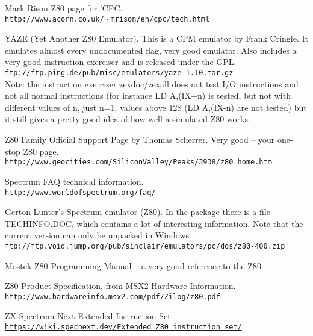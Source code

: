 \documentclass[oneside,a4paper]{book}
\begin{document}
\begin{thebibliography}{}

   Mark Rison Z80 page for !CPC. \\
   {\tt \small http://www.acorn.co.uk/$\sim$mrison/en/cpc/tech.html}

  YAZE (Yet Another Z80 Emulator). This is a CPM emulator 
   by Frank Cringle. It emulates almost every undocumented flag, very good
   emulator. Also includes a very good instruction exerciser and is released
   under the GPL. \\
   {\tt \small ftp://ftp.ping.de/pub/misc/emulators/yaze-1.10.tar.gz} \\
   Note: the instruction exerciser zexdoc/zexall does not test I/O instructions 
   and not all normal instructions (for instance LD A,(IX+n) is tested, but not 
   with different values of n, just n=1, values above 128 (LD A,(IX-n) are not 
   tested) but it still gives a pretty good idea of how well a simulated Z80 
   works.
   
  Z80 Family Official Support Page by Thomas Scherrer. Very 
   good -- your one-stop Z80 page. \\
   {\tt \small http://www.geocities.com/SiliconValley/Peaks/3938/z80\_home.htm}

  Spectrum FAQ technical information. \\
   {\tt \small http://www.worldofspectrum.org/faq/}

  Gerton Lunter's Spectrum emulator (Z80). In the package 
   there is a file TECHINFO.DOC, which contains a lot of interesting 
   information. Note that the current version can only be unpacked in
   Windows. \\
   {\tt \small ftp://ftp.void.jump.org/pub/sinclair/emulators/pc/dos/z80-400.zip}

  Mostek Z80 Programming Manual -- a very good reference
   to the Z80.

  Z80 Product Specification, from MSX2 Hardware Information. \\
   {\tt \small http://www.hardwareinfo.msx2.com/pdf/Zilog/z80.pdf}

  ZX Spectrum Next Extended Instruction Set. \\
   {\tt \small \url{https://wiki.specnext.dev/Extended_Z80_instruction_set/}}

\end{thebibliography}
\end{document}
